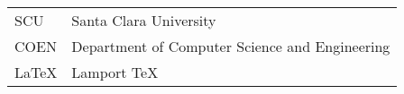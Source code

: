 {
\singlespace
\renewcommand{\arraystretch}{1.2}%
\begin{tabularx}{\linewidth}{ l X }
  SCU & Santa Clara University  \\
  COEN & Department of Computer Science and Engineering\\
  LaTeX &  Lamport TeX \\
\end{tabularx}
}